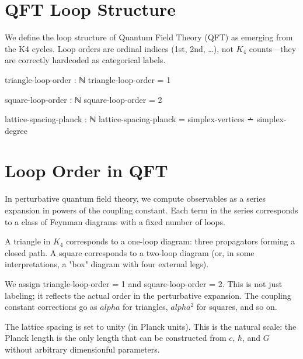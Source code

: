 \documentclass[11pt,a4paper]{book}
\def\alpha{alpha}%
\def\texttt#1{#1}%
\begin{document}
\section{QFT Loop Structure}

We define the loop structure of Quantum Field Theory (QFT) as emerging from the K4 cycles.
Loop orders are ordinal indices (1st, 2nd, \ldots), not $K_4$ counts---they are correctly
hardcoded as categorical labels.

\begin{code}
triangle-loop-order : ℕ
triangle-loop-order = 1

square-loop-order : ℕ
square-loop-order = 2

lattice-spacing-planck : ℕ
lattice-spacing-planck = simplex-vertices ∸ simplex-degree
\end{code}

\section{Loop Order in QFT}

In perturbative quantum field theory, we compute observables as a series expansion in 
powers of the coupling constant. Each term in the series corresponds to a class of Feynman 
diagrams with a fixed number of loops.

A triangle in $K_4$ corresponds to a one-loop diagram: three propagators forming a closed 
path. A square corresponds to a two-loop diagram (or, in some interpretations, a "box" 
diagram with four external legs).

We assign \texttt{triangle-loop-order = 1} and \texttt{square-loop-order = 2}. This is 
not just labeling; it reflects the actual order in the perturbative expansion. The coupling 
constant corrections go as $\alpha$ for triangles, $\alpha^2$ for squares, and so on.

The lattice spacing is set to unity (in Planck units). This is the natural scale: the 
Planck length is the only length that can be constructed from $c$, $\hbar$, and $G$ without 
arbitrary dimensionful parameters.
\end{document}

